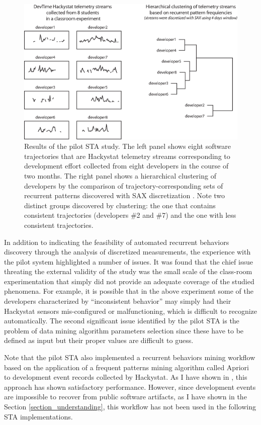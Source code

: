 \begin{figure}[t]
   \centering
   \includegraphics[width=145mm]{figures/STA1.eps}
   \caption{Results of the pilot STA study. 
   The left panel shows eight software trajectories that are Hackystat telemetry streams 
   corresponding to development effort \cite{citeulike:557296} collected from eight developers in the course of two months.
   The right panel shows a hierarchical clustering of developers by the comparison of trajectory-corresponding sets of 
   recurrent patterns discovered with SAX discretization \cite{sax}. 
   Note two distinct groups discovered by clustering: the one that contains consistent trajectories (developers \#2 and \#7) 
   and the one with less consistent trajectories.}
   \label{fig:STA1-results}
\end{figure}

In addition to indicating the feasibility of automated recurrent behaviors discovery through the analysis of discretized 
measurements, the experience with the pilot system highlighted a number of issues.
It was found that the chief issue threating the external validity of the study was the small scale of the class-room 
experimentation that simply did not provide an adequate coverage of the studied phenomena. 
For example, it is possible that in the above experiment some of the developers characterized by ``inconsistent 
behavior'' may simply had their Hackystat sensors mis-configured or malfunctioning, which is difficult to recognize automatically.
The second significant issue identified by the pilot STA is the problem of data mining algorithm parameters 
selection since these have to be defined as input but their proper values are difficult to guess.

Note that the pilot STA also implemented a recurrent behaviors mining workflow based on the application of 
a frequent patterns mining algorithm called Apriori \cite{citeulike:775528} to development event records collected 
by Hackystat. As I have shown in \cite{citeulike:13159603}, this approach has shown satisfactory performance. 
However, since development events are impossible to recover from public software artifacts, 
as I have shown in the Section \ref{section_understanding}, this workflow has not been used in the following STA 
implementations.

